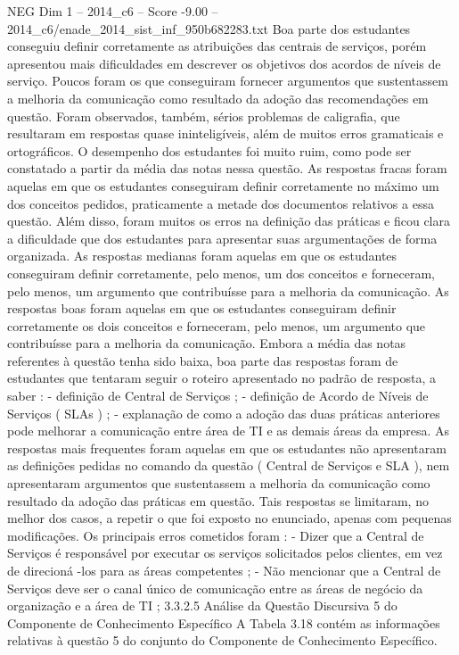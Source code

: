 \begin{textsample}{NEG Dim 1 – 2014\_c6 – Score -9.00 – 2014\_c6/enade\_2014\_sist\_inf\_950b682283.txt}
Boa parte dos estudantes conseguiu definir corretamente as atribuições das centrais de serviços, porém apresentou mais dificuldades em descrever os objetivos dos acordos de níveis de serviço.
Poucos foram os que conseguiram fornecer argumentos que sustentassem a melhoria da comunicação como resultado da adoção das recomendações em questão.
Foram observados, também, sérios problemas de caligrafia, que resultaram em respostas quase ininteligíveis, além de muitos erros gramaticais e ortográficos.
O desempenho dos estudantes foi muito ruim, como pode ser constatado a partir da média das notas nessa questão.
As respostas fracas foram aquelas em que os estudantes conseguiram definir corretamente no máximo um dos conceitos pedidos, praticamente a metade dos documentos relativos a essa questão.
Além disso, foram muitos os erros na definição das práticas e ficou clara a dificuldade que dos estudantes para apresentar suas argumentações de forma organizada.
As respostas medianas foram aquelas em que os estudantes conseguiram definir corretamente, pelo menos, um dos conceitos e forneceram, pelo menos, um argumento que contribuísse para a melhoria da comunicação.
As respostas boas foram aquelas em que os estudantes conseguiram definir corretamente os dois conceitos e forneceram, pelo menos, um argumento que contribuísse para a melhoria da comunicação.
Embora a média das notas referentes à questão tenha sido baixa, boa parte das respostas foram de estudantes que tentaram seguir o roteiro apresentado no padrão de resposta, a saber : - definição de Central de Serviços ; - definição de Acordo de Níveis de Serviços ( SLAs ) ; - explanação de como a adoção das duas práticas anteriores pode melhorar a comunicação entre área de TI e as demais áreas da empresa.
As respostas mais frequentes foram aquelas em que os estudantes não apresentaram as definições pedidas no comando da questão ( Central de Serviços e SLA ), nem apresentaram argumentos que sustentassem a melhoria da comunicação como resultado da adoção das práticas em questão.
Tais respostas se limitaram, no melhor dos casos, a repetir o que foi exposto no enunciado, apenas com pequenas modificações.
Os principais erros cometidos foram : - Dizer que a Central de Serviços é responsável por executar os serviços solicitados pelos clientes, em vez de direcioná -los para as áreas competentes ; - Não mencionar que a Central de Serviços deve ser o canal único de comunicação entre as áreas de negócio da organização e a área de TI ; 3.3.2.5 Análise da Questão Discursiva 5 do Componente de Conhecimento Específico A Tabela 3.18 contém as informações relativas à questão 5 do conjunto do Componente de Conhecimento Específico.

\end{textsample}

